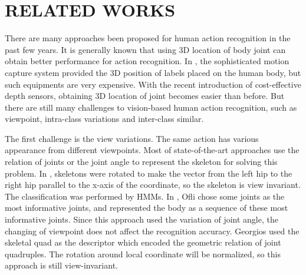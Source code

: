\documentclass[conference]{IEEEtran}
\begin{document}

\section{RELATED WORKS}
\label{sec:RELATED WORKS}
There are many approaches been proposed for human action recognition in the past few years.
It is generally known that using 3D location of body joint can obtain better performance for action recognition.
In \cite{multi_cameras_obtain_3D_data}, the sophisticated motion capture system provided the 3D position of labels placed on the human body, but such equipments are very expensive.
With the recent introduction of cost-effective depth sensors, obtaining 3D location of joint becomes easier than before.
But there are still many challenges to vision-based human action recognition,
such as viewpoint, intra-class variations and inter-class similar.

The first challenge is the view variations.
The same action has various appearance from different viewpoints.
Most of state-of-the-art approaches use the relation of joints or the joint angle to represent the skeleton for solving this problem.
In \cite{hostogram_of_3d_joints}, skeletons were rotated to make the vector from the left hip to the right hip parallel to the x-axis of the coordinate, so the skeleton is view invariant.
The classification was performed by HMMs.
In \cite{Sequence_of_the_most_informative_joints}, Ofli chose some joints as the most informative joints, and represented the body as a sequence of these most informative joints.
Since this approach used the variation of joint angle, the changing of viewpoint does not affect the recognition accuracy.
Georgios \cite{skeletal_quads} used the skeletal quad as the descriptor which encoded the geometric relation of joint quadruples.
The rotation around local coordinate will be normalized, so this approach is still view-invariant.
\end{document}
